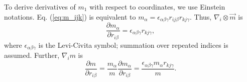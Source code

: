 \documentclass{article}
\begin{document}
To derive derivatives of $m_1$ with respect to coordinates, 
we use Einstein notations.
Eq. (\ref{eq:m_ijk}) is equivalent to
$m_\alpha = \epsilon_{\alpha \beta \gamma} r_{ij \beta} r_{kj \gamma}$.
%
Thus, 
$\nabla_i \otimes \vec m$
is 
\begin{equation}
  \frac {\partial m_\alpha} {\partial r_{i \beta}} 
  = \epsilon_{\alpha \beta \gamma} r_{k j \gamma},
  \label{eq:dmadrib}
\end{equation}
where $\epsilon_{\alpha \beta \gamma}$ is the Levi-Civita symbol;
%
summation over repeated indices is assumed.
%
Further,
$\nabla_i m$ is 
\begin{equation}
    \frac {\partial m} {\partial r_{i  \beta}} 
  = \frac {m_\alpha}{m} \frac {\partial m_\alpha} {\partial r_{i \beta}} 
  = \frac {\epsilon_{\alpha \beta \gamma} m_\alpha r_{k j \gamma}}{m}.
  \label{eq:dmdrib}
\end{equation}
%
\end{document}
